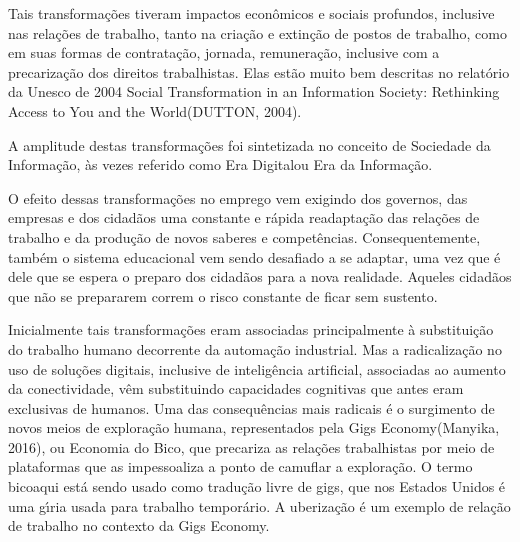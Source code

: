 \documentclass[
12pt,		%
openright,	%
twoside,  %
a4paper,			%
chapter=TITLE,		%
english,			%
french,				%
spanish,			%
brazil				%
]{USPSC-classe/USPSC}
\begin{document}
Tais transforma\c{c}\~oes tiveram impactos econ\^omicos e sociais profundos, inclusive nas rela\c{c}\~oes de trabalho, tanto na cria\c{c}\~ao e extin\c{c}\~ao de postos de trabalho, como em suas formas de contrata\c{c}\~ao, jornada, remunera\c{c}\~ao, inclusive com a precariza\c{c}\~ao dos direitos trabalhistas. Elas est\~ao muito bem descritas  no relat\'orio da Unesco  de 2004 \textquotedbl Social Transformation in an Information Society: Rethinking Access to You and the World\textquotedbl  (DUTTON, 2004).




A amplitude destas transforma\c{c}\~oes foi sintetizada no conceito de \textquotedbl Sociedade da Informa\c{c}\~ao\textquotedbl , \`as vezes referido como \textquotedbl Era Digital\textquotedbl  ou \textquotedbl Era da Informa\c{c}\~ao\textquotedbl .




O efeito dessas transforma\c{c}\~oes no emprego vem exigindo dos governos, das empresas e dos cidad\~aos uma constante e r\'apida readapta\c{c}\~ao  das rela\c{c}\~oes de trabalho e da produ\c{c}\~ao de novos saberes e compet\^encias. Consequentemente, tamb\'em o sistema educacional vem sendo desafiado a se adaptar, uma vez que \'e dele que se espera o preparo dos cidad\~aos para a nova realidade. Aqueles cidad\~aos que n\~ao se prepararem correm o risco constante de ficar sem sustento.




Inicialmente tais transforma\c{c}\~oes eram associadas principalmente \`a substitui\c{c}\~ao do trabalho humano decorrente da automa\c{c}\~ao industrial. Mas a radicaliza\c{c}\~ao no uso de solu\c{c}\~oes digitais, inclusive de intelig\^encia artificial, associadas ao aumento da conectividade, v\^em substituindo capacidades \textquotedbl cognitivas que antes eram exclusivas de humanos\textquotedbl [4 XXX]. Uma das consequ\^encias mais radicais \'e o surgimento de novos meios de explora\c{c}\~ao humana, representados pela \textquotedbl Gigs Economy\textquotedbl   (Manyika, 2016), ou \textquotedbl Economia do Bico\textquotedbl , que precariza as rela\c{c}\~oes trabalhistas por meio de plataformas que as impessoaliza a ponto de camuflar a explora\c{c}\~ao. O termo \textquotedbl bico\textquotedbl  aqui est\'a sendo usado como tradu\c{c}\~ao livre de \textquotedbl gigs\textquotedbl , que nos Estados Unidos \'e uma g\'{\i}ria usada para trabalho tempor\'ario. A uberiza\c{c}\~ao \'e um exemplo de rela\c{c}\~ao de trabalho no contexto da Gigs Economy.
\end{document}

